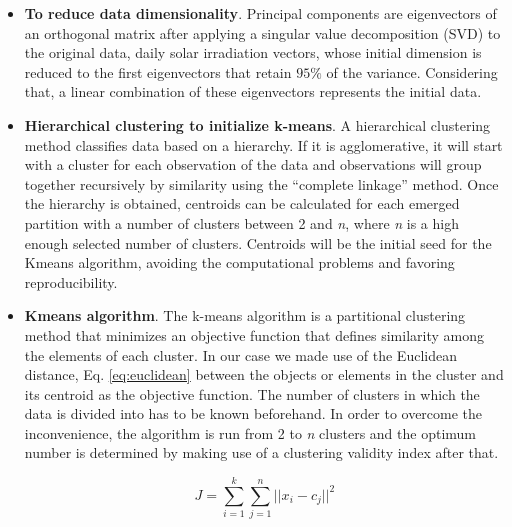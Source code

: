 \begin{itemize}
\item \textbf{To reduce data dimensionality}. Principal components are eigenvectors of an orthogonal matrix after applying a singular value decomposition (SVD) to the original data, daily solar irradiation vectors, whose initial dimension is reduced to the first eigenvectors that retain $95\%$ of the variance. Considering that, a linear combination of these eigenvectors represents the initial data.
\item \textbf{Hierarchical clustering to initialize k-means}. A hierarchical clustering method classifies data based on a hierarchy. If it is agglomerative, it will start with a cluster for each observation of the data and observations will group together recursively by similarity using the “complete linkage” method. Once the hierarchy is obtained, centroids can be calculated for each emerged partition with a number of clusters between 2 and \textit{n}, where \textit{n} is a high enough selected number of clusters. Centroids will be the initial seed for the Kmeans algorithm, avoiding the computational problems and favoring reproducibility.
\item \textbf{Kmeans algorithm}. The k-means algorithm is a partitional clustering method that minimizes an objective function that defines similarity among the elements of each cluster. In our case we made use of the Euclidean distance, Eq. \ref{eq:euclidean} between the objects or elements in the cluster and its centroid as the objective function. The number of clusters in which the data is divided into has to be known beforehand. In order to overcome the inconvenience, the algorithm is run from 2 to \textit{n} clusters and the optimum number is determined by making use of a clustering validity index after that.

\begin{equation}\label{eq:euclidean}
    J =\sum_{i=1}^{k}\sum_{j=1}^{n}{||x_i-c_j||}^2
\end{equation}




\end{itemize}
